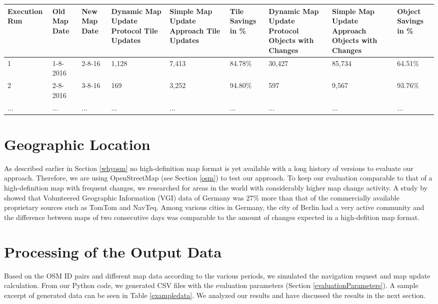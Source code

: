 \begin{table*}
\caption{A sample excerpt of the evaluation parameters obtained in the evaluation. Some additional parameters were also collected, but not shown in this example.}
\begin{small}
\centering
\begin{tabular}
{p{1.3cm}p{1.3cm}p{1.3cm}p{1.3cm}p{1.3cm}p{1.3cm}p{1.3cm}p{1.3cm}p{1.3cm}}
Execution Run&	Old Map Date & New Map Date & Dynamic Map Update Protocol Tile Updates & Simple Map Update Approach Tile Updates & Tile Savings in \% & Dynamic Map Update Protocol Objects with Changes & Simple Map Update Approach Objects with Changes & Object Savings in \% \\ 
\hline 
1&	1-8-2016&	2-8-16&	1,128&	7,413&		84.78\%&	30,427&	85,734&	64.51\% \\ 
\hline 
2&	2-8-2016&	3-8-16&	169&	3,252&		94.80\%&	597&	9,567&	93.76\% \\
\hline
 ... & ... & ... & ... & ... & ... & ... & ... & ... \\ 
\end{tabular}
\end{small}
\label{exampledata}
\end{table*}


\section{Geographic Location}
As described earlier in Section \ref{whyosm} no high-definition map format is yet available with a long history of versions to evaluate our approach. Therefore, we are using OpenStreetMap (see Section \ref{osm}) to test our approach. To keep our evaluation comparable to that of a high-definition map with frequent changes, we researched for areas in the world with considerably higher map change activity. A study by \citet{neis2011street} showed that Volunteered Geographic Information (VGI) data of Germany was 27\% more than that of the commercially available proprietary sources such as TomTom and NavTeq. Among various cities in Germany, the city of Berlin had a very active community and the difference between maps of two consecutive days was comparable to the amount of changes expected in a high-defition map format. \\

\section{Processing of the Output Data}
Based on the OSM ID pairs and different map data according to the various periods, we simulated the navigation request and map update calculation. From our Python code, we generated CSV files with the evaluation parameters (Section \ref{evaluationParameters}). A sample excerpt of generated data can be seen in Table \ref{exampledata}. We analyzed our results and have discussed the results in the next section.  

